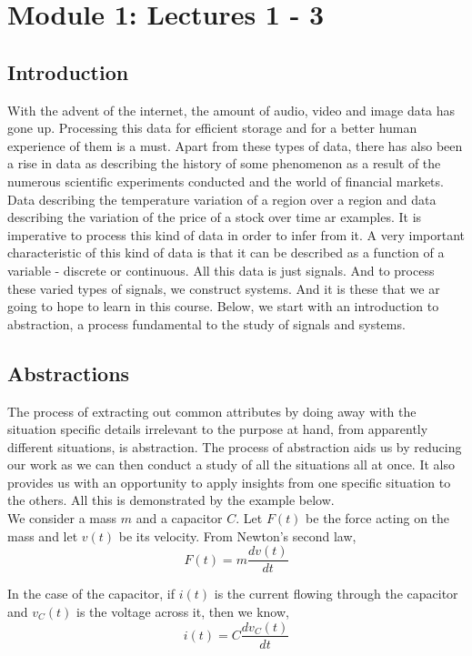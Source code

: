 \section{Module 1: Lectures 1 - 3}


\subsection{Introduction}
With the advent of the internet, the amount of audio, video and image data has gone up. Processing this data for efficient storage and for a better human experience of them is a must. Apart from these types of data, there has also been a rise in data as describing the history of some phenomenon as a result of the numerous scientific experiments conducted and the world of financial markets. Data describing the temperature variation of a region over a region and data describing the variation of the price of a stock over time ar examples. It is imperative to process this kind of data in order to infer from it. A very important characteristic of this kind of data is that it can be described as a function of a variable - discrete or continuous. All this data is just signals. And to process these varied types of signals, we construct systems. And it is these that we ar going to hope to learn in this course. Below, we start with an introduction to abstraction, a process fundamental to the study of signals and systems.

\subsection{Abstractions}
The process of extracting out common attributes by doing away with the situation specific details irrelevant to the purpose at hand, from apparently different situations, is abstraction. The process of abstraction aids us by reducing our work as we can then conduct a study of all the situations all at once. It also provides us with an opportunity to apply insights from one specific situation to the others. All this is demonstrated by the example below.\\

We consider a mass $m$ and a capacitor $C$. Let $F(t)$ be the force acting on the mass and let $v(t)$ be its velocity. From Newton's second law,
\[
F(t) = m\frac{dv(t)}{dt}
\]

In the case of the capacitor, if $i(t)$ is the current flowing through the capacitor and $v_{C}(t)$ is the voltage across it, then we know,
\[
i(t) = C\frac{dv_{C}(t)}{dt}
\]

